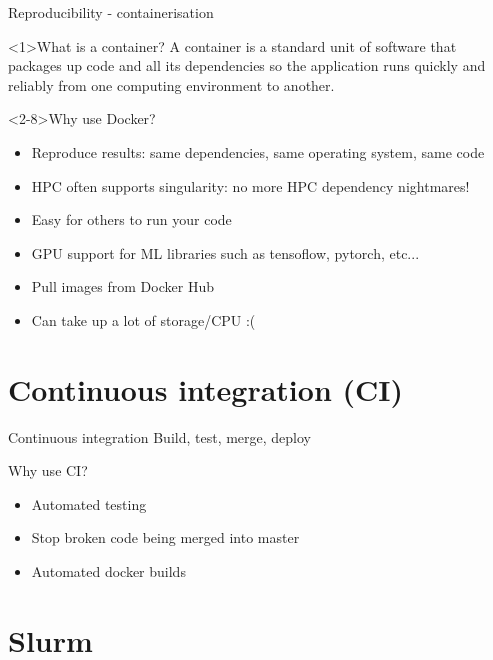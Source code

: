 \documentclass[t]{beamer}
\begin{document}
\begin{frame}{Reproducibility - containerisation}
    \begin{block}<1>{What is a container?}
        A container is a standard unit of software that packages up code and all its dependencies so the application runs quickly and reliably from one computing environment to another. 
    \end{block}

    \begin{block}<2-8>{Why use Docker?}
        \begin{itemize}
            \item<3> Reproduce results: same dependencies, same operating system, same code
            \item<4> HPC often supports singularity: no more HPC dependency nightmares!
            \item<5> Easy for others to run your code
            \item<6> GPU support for ML libraries such as tensoflow, pytorch, etc...
            \item<7> Pull images from Docker Hub
            \item<8> Can take up a lot of storage/CPU :(
        \end{itemize}
    \end{block}
\end{frame}

\section{Continuous integration (CI)}

\begin{frame}{Continuous integration}
    Build, test, merge, deploy
    \begin{block}{Why use CI?}
        \begin{itemize}
            \item<1> Automated testing
            \item<2> Stop broken code being merged into master
            \item<3> Automated docker builds
        \end{itemize}
    \end{block}
\end{frame}

\section{Slurm}
\end{document}
